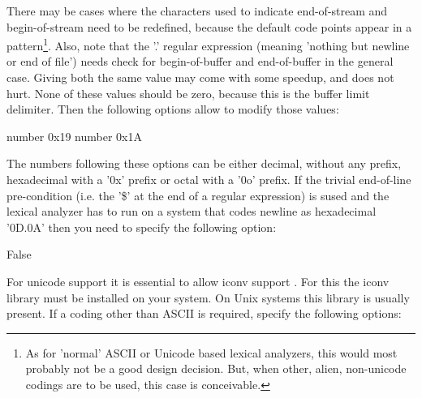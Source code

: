 There may be cases where the characters used to indicate end-of-stream and
begin-of-stream need to be redefined, because the default code points appear in
a pattern\footnote{As for 'normal' ASCII or Unicode based lexical analyzers,
    this would most probably not be a good design decision. But, when other,
    alien, non-unicode codings are to be used, this case is conceivable.}.
    Also, note that the '.' regular expression (meaning 'nothing but newline or
	    end of file') needs check for begin-of-buffer and end-of-buffer in
    the general case. Giving both the same value may come with some speedup,
    and does not hurt. None of these values should be zero, because this is the buffer
    limit delimiter. Then the following options allow to modify those values:

\begin{description}
     {number} {0x19}
          {}
     {number} {0x1A}
          {}
\end{description}

The numbers following these options can be either decimal, without any prefix,
    hexadecimal with a '0x' prefix or octal with a '0o' prefix.  If the trivial
    end-of-line pre-condition (i.e. the '\$' at the end of a regular
	    expression) is sused and the lexical analyzer has to run on a
    system that codes newline as hexadecimal '0D.0A' then you need to specify
    the following option:

\begin{description}
     {} {False}
          {}
\end{description}

For unicode support it is essential to allow iconv support \cite{}. For this 
the iconv library must be installed on your system. On Unix systems this library
is usually present. If a coding other than ASCII is required, specify the following
options:


